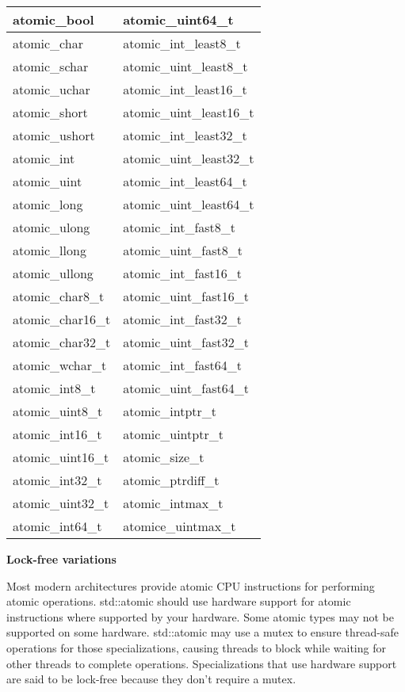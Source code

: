 \begin{table}[H]
\centering
\begin{tabular}{|l|l|}
\hline
atomic\_bool      & atomic\_uint64\_t        \\ \hline
atomic\_char      & atomic\_int\_least8\_t   \\ \hline
atomic\_schar     & atomic\_uint\_least8\_t  \\ \hline
atomic\_uchar     & atomic\_int\_least16\_t  \\ \hline
atomic\_short     & atomic\_uint\_least16\_t \\ \hline
atomic\_ushort    & atomic\_int\_least32\_t  \\ \hline
atomic\_int       & atomic\_uint\_least32\_t \\ \hline
atomic\_uint      & atomic\_int\_least64\_t  \\ \hline
atomic\_long      & atomic\_uint\_least64\_t \\ \hline
atomic\_ulong     & atomic\_int\_fast8\_t    \\ \hline
atomic\_llong     & atomic\_uint\_fast8\_t   \\ \hline
atomic\_ullong    & atomic\_int\_fast16\_t   \\ \hline
atomic\_char8\_t  & atomic\_uint\_fast16\_t  \\ \hline
atomic\_char16\_t & atomic\_int\_fast32\_t   \\ \hline
atomic\_char32\_t & atomic\_uint\_fast32\_t  \\ \hline
atomic\_wchar\_t  & atomic\_int\_fast64\_t   \\ \hline
atomic\_int8\_t   & atomic\_uint\_fast64\_t  \\ \hline
atomic\_uint8\_t  & atomic\_intptr\_t        \\ \hline
atomic\_int16\_t  & atomic\_uintptr\_t       \\ \hline
atomic\_uint16\_t & atomic\_size\_t          \\ \hline
atomic\_int32\_t  & atomic\_ptrdiff\_t       \\ \hline
atomic\_uint32\_t & atomic\_intmax\_t        \\ \hline
atomic\_int64\_t  & atomice\_uintmax\_t      \\ \hline
\end{tabular}
\end{table}

\noindent
\textbf{Lock-free variations}

Most modern architectures provide atomic CPU instructions for performing atomic operations. std::atomic should use hardware support for atomic instructions where supported by your hardware. Some atomic types may not be supported on some hardware. std::atomic may use a mutex to ensure thread-safe operations for those specializations, causing threads to block while waiting for other threads to complete operations. Specializations that use hardware support are said to be lock-free because they don't require a mutex.

